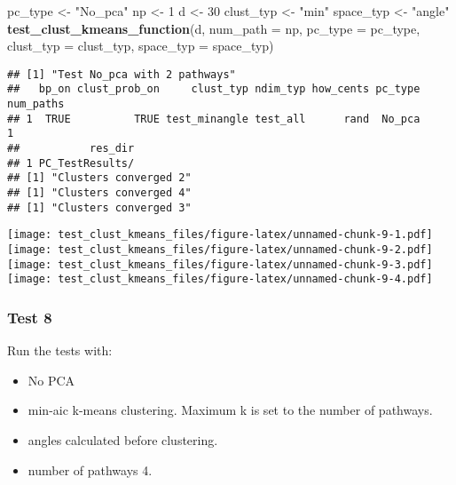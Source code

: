 \documentclass[
]{article}
\newenvironment{Shaded}{\begin{snugshade}}{\end{snugshade}}
\newcommand{\AttributeTok}[1]{\textcolor[rgb]{0.13,0.29,0.53}{#1}}
\newcommand{\DecValTok}[1]{\textcolor[rgb]{0.00,0.00,0.81}{#1}}
\newcommand{\FunctionTok}[1]{\textcolor[rgb]{0.13,0.29,0.53}{\textbf{#1}}}
\newcommand{\NormalTok}[1]{#1}
\newcommand{\OtherTok}[1]{\textcolor[rgb]{0.56,0.35,0.01}{#1}}
\newcommand{\StringTok}[1]{\textcolor[rgb]{0.31,0.60,0.02}{#1}}
\providecommand{\tightlist}{%
  \setlength{\itemsep}{0pt}\setlength{\parskip}{0pt}}
\begin{document}
\begin{Shaded}
\begin{Highlighting}[]
\NormalTok{pc\_type }\OtherTok{\textless{}{-}} \StringTok{"No\_pca"}
\NormalTok{np }\OtherTok{\textless{}{-}} \DecValTok{1}
\NormalTok{d }\OtherTok{\textless{}{-}} \DecValTok{30}
\NormalTok{clust\_typ }\OtherTok{\textless{}{-}} \StringTok{"min"}
\NormalTok{space\_typ }\OtherTok{\textless{}{-}} \StringTok{"angle"}
\FunctionTok{test\_clust\_kmeans\_function}\NormalTok{(d,}
                           \AttributeTok{num\_path =}\NormalTok{ np,}
                           \AttributeTok{pc\_type =}\NormalTok{ pc\_type,}
                           \AttributeTok{clust\_typ =}\NormalTok{ clust\_typ,}
                           \AttributeTok{space\_typ =}\NormalTok{ space\_typ)}
\end{Highlighting}
\end{Shaded}

\begin{verbatim}
## [1] "Test No_pca with 2 pathways"
##   bp_on clust_prob_on     clust_typ ndim_typ how_cents pc_type num_paths
## 1  TRUE          TRUE test_minangle test_all      rand  No_pca         1
##           res_dir
## 1 PC_TestResults/
## [1] "Clusters converged 2"
## [1] "Clusters converged 4"
## [1] "Clusters converged 3"
\end{verbatim}

\texttt{[image: test\_clust\_kmeans\_files/figure-latex/unnamed-chunk-9-1.pdf]}
\texttt{[image: test\_clust\_kmeans\_files/figure-latex/unnamed-chunk-9-2.pdf]}
\texttt{[image: test\_clust\_kmeans\_files/figure-latex/unnamed-chunk-9-3.pdf]}
\texttt{[image: test\_clust\_kmeans\_files/figure-latex/unnamed-chunk-9-4.pdf]}

\hypertarget{test-8}{%
\subsubsection{Test 8}\label{test-8}}

Run the tests with:

\begin{itemize}
\tightlist
\item
  No PCA
\item
  min-aic k-means clustering. Maximum k is set to the number of
  pathways.
\item
  angles calculated before clustering.
\item
  number of pathways 4.
\end{itemize}
\end{document}
